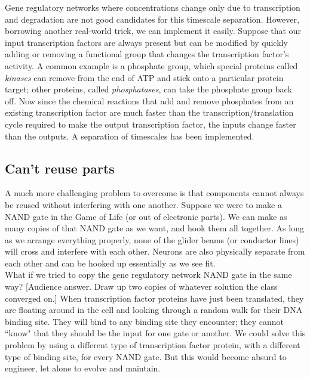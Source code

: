\documentclass{article}
\begin{document}
Gene regulatory networks where concentrations change only due to transcription and degradation are not good candidates for this timescale separation. However, borrowing another real-world trick, we can implement it easily. Suppose that our input transcription factors are always present but can be modified by quickly adding or removing a functional group that changes the transcription factor's activity. A common example is a phosphate group, which special proteins called \textit{kinases} can remove from the end of ATP and stick onto a particular protein target; other proteins, called \textit{phosphatases}, can take the phosphate group back off. Now since the chemical reactions that add and remove phosphates from an existing transcription factor are much faster than the transcription/translation cycle required to make the output transcription factor, the inputs change faster than the outputs. A separation of timescales has been implemented.

\subsection*{Can't reuse parts}

A much more challenging problem to overcome is that components cannot always be reused without interfering with one another. Suppose we were to make a NAND gate in the Game of Life (or out of electronic parts). We can make as many copies of that NAND gate as we want, and hook them all together. As long as we arrange everything properly, none of the glider beams (or conductor lines) will cross and interfere with each other. Neurons are also physically separate from each other and can be hooked up essentially as we see fit.\\

What if we tried to copy the gene regulatory network NAND gate in the same way? [Audience answer. Draw up two copies of whatever solution the class converged on.] When transcription factor proteins have just been translated, they are floating around in the cell and looking through a random walk for their DNA binding site. They will bind to any binding site they encounter; they cannot ``know" that they should be the input for one gate or another. We could solve this problem by using a different type of transcription factor protein, with a different type of binding site, for every NAND gate. But this would become absurd to engineer, let alone to evolve and maintain.


\end{document}

